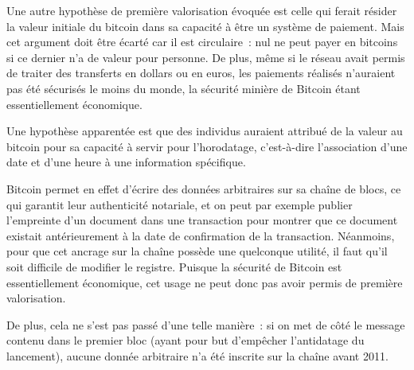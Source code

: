 Une autre hypothèse de première valorisation évoquée est celle qui ferait résider la valeur initiale du bitcoin dans sa capacité à être un système de paiement. Mais cet argument doit être écarté car il est circulaire~: nul ne peut payer en bitcoins si ce dernier n'a de valeur pour personne. De plus, même si le réseau avait permis de traiter des transferts en dollars ou en euros, les paiements réalisés n'auraient pas été sécurisés le moins du monde, la sécurité minière de Bitcoin étant essentiellement économique.


Une hypothèse apparentée est que des individus auraient attribué de la valeur au bitcoin pour sa capacité à servir pour l'horodatage, c'est-à-dire l'association d'une date et d'une heure à une information spécifique.

Bitcoin permet en effet d'écrire des données arbitraires sur sa chaîne de blocs, ce qui garantit leur authenticité notariale, et on peut par exemple publier l'empreinte d'un document dans une transaction pour montrer que ce document existait antérieurement à la date de confirmation de la transaction. Néanmoins, pour que cet ancrage sur la chaîne possède une quelconque utilité, il faut qu'il soit difficile de modifier le registre. Puisque la sécurité de Bitcoin est essentiellement économique, cet usage ne peut donc pas avoir permis de première valorisation.

De plus, cela ne s'est pas passé d'une telle manière~: si on met de côté le message contenu dans le premier bloc (ayant pour but d'empêcher l'antidatage du lancement), aucune donnée arbitraire n'a été inscrite sur la chaîne avant 2011.

